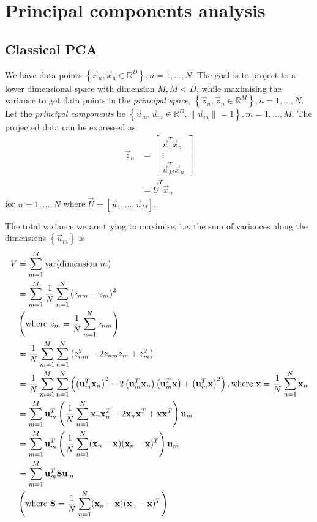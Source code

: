 \section{Principal components analysis}
\subsection{Classical PCA}
We have data points $\left\{\vec x_n, \vec x_n \in \mathbb R^D\right\}, n = 1, \dotsc, N$. The goal is to project to a lower dimensional space with dimension $M, M < D$, while maximising the variance to get data points in the \emph{principal space}, $\left\{\vec z_n, \vec z_n \in \mathbb R^M\right\}, n = 1, \dotsc, N$. Let the \emph{principal components} be $\left\{\vec u_m, \vec u_m \in \mathbb R^D, \| \vec u_m \| = 1\right\}, m = 1, \dotsc, M$. The projected data can be expressed as
\begin{align*}
    \vec z_n    &= 
        \begin{bmatrix}
            \vec u_1^T \vec x_n \\
            \vdots \\
            \vec u_M^T \vec x_n
        \end{bmatrix} \\
                &= \vec U^T \vec x_n
\end{align*}
for $n = 1, \dotsc, N$ where $\vec U = [\vec u_1, \dotsc, \vec u_M]$.

The total variance we are trying to maximise, i.e. the sum of variances along the dimensions $\left\{\vec u_m\right\}$ is
\begin{align}
    V   &= \sum_{m = 1}^M \operatorname{\mathrm{var}}(\text{dimension } m) \nonumber\\
        &= \sum_{m = 1}^M \frac{1}{N} \sum_{n = 1}^N \left( z_{nm} - \bar{z}_m \right)^2 \nonumber\\
        & \left(\text{where } \bar{z}_m = \frac{1}{N} \sum_{n = 1}^N z_{nm} \right) \label{eqn:models-pca-dataMean} \\
        &= \frac{1}{N} \sum_{m = 1}^M \sum_{n = 1}^N \left( z_{nm}^2 - 2 z_{nm} \bar z_m + \bar z_m^2 \right) \nonumber\\
        &= \frac{1}{N} \sum_{m = 1}^M \sum_{n = 1}^N \left( \left(\boldsymbol{\mathbf{u}}_m^T \boldsymbol{\mathbf{x}}_n \right)^2 - 2 \left(\boldsymbol{\mathbf{u}}_m^T \boldsymbol{\mathbf{x}}_n\right) \left(\boldsymbol{\mathbf{u}}_m^T \bar{\boldsymbol{\mathbf{x}}}\right) + \left( \boldsymbol{\mathbf{u}}_m^T \bar{\boldsymbol{\mathbf{x}}} \right)^2 \right), \text{where } \bar{\boldsymbol{\mathbf{x}}} = \frac{1}{N} \sum_{n = 1}^N \boldsymbol{\mathbf{x}}_n \nonumber\\
        &= \sum_{m = 1}^M \boldsymbol{\mathbf{u}}_m^T \left( \frac{1}{N} \sum_{n = 1}^N \boldsymbol{\mathbf{x}}_n \boldsymbol{\mathbf{x}}_n^T - 2 \boldsymbol{\mathbf{x}}_n \bar{\boldsymbol{\mathbf{x}}}^T + \bar{\boldsymbol{\mathbf{x}}} \bar{\boldsymbol{\mathbf{x}}}^T \right) \boldsymbol{\mathbf{u}}_m \nonumber\\
        &= \sum_{m = 1}^M \boldsymbol{\mathbf{u}}_m^T \left( \frac{1}{N} \sum_{n = 1}^N (\boldsymbol{\mathbf{x}}_n - \bar{\boldsymbol{\mathbf{x}}})(\boldsymbol{\mathbf{x}}_n - \bar{\boldsymbol{\mathbf{x}}})^T \right) \boldsymbol{\mathbf{u}}_m \nonumber\\
        &= \sum_{m = 1}^M \boldsymbol{\mathbf{u}}_m^T \boldsymbol{\mathbf{S}} \boldsymbol{\mathbf{u}}_m \label{eqn:models-pca-totalVariance}\\
        &\left( \text{where } \boldsymbol{\mathbf{S}} = \frac{1}{N} \sum_{n = 1}^N (\boldsymbol{\mathbf{x}}_n - \bar{\boldsymbol{\mathbf{x}}})(\boldsymbol{\mathbf{x}}_n - \bar{\boldsymbol{\mathbf{x}}})^T \right) \label{eqn:models-pca-dataCov}
\end{align}

